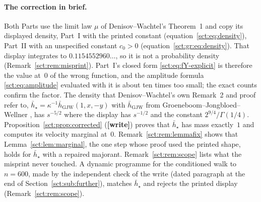\documentclass[11pt,letterpaper]{article}
\theoremstyle{definition}\newtheorem{remark}[theorem]{Remark}
\newcommand{\hstar}{\bar h_\star}\newcommand{\fstar}{f_\star}\newcommand{\Kstar}{K_\star}
\begin{document}
\paragraph{The correction in brief.} Both Parts use the limit law $\mu$ of Denisov--Wachtel's Theorem~1 \cite{dw} and copy its displayed density, Part~I with the printed constant (equation~\eqref{sct:eq:density}), Part~II with an unspecified constant $c_0>0$ (equation~\eqref{sct:gr:eq:density}). That display integrates to $0.1154552960\ldots$, so it is not a probability density (Remark~\ref{sct:rem:misprint}). Part~I's closed form \eqref{sct:eq:fY-explicit} is therefore the value at~$0$ of the wrong function, and the amplitude formula \eqref{sct:eq:amplitude} evaluated with it is about ten times too small; the exact counts confirm the factor. The density that Denisov--Wachtel's own Remark~2 and proof refer to, $\hstar=\kappa^{-1}\bar h_{\mathrm{GJW}}(1,x,-y)$ with $\bar h_{\mathrm{GJW}}$ from Groeneboom--Jongbloed--Wellner \cite[(2.24)]{gjw}, has $s^{-5/2}$ where the display has $s^{-1/2}$ and the constant $2^{9/4}/\Gamma(1/4)$. Proposition~\ref{sct:prop:corrected} (\textbf{[write]}) proves that $\hstar$ has mass exactly~$1$ and computes its velocity marginal at~$0$. Remark~\ref{sct:rem:lemmafix} shows that Lemma~\ref{sct:lem:marginal}, the one step whose proof used the printed shape, holds for $\hstar$ with a repaired majorant. Remark~\ref{sct:rem:scope} lists what the misprint never touched. A dynamic programme for the conditioned walk to $n=600$, made by the independent check of the write (dated paragraph at the end of Section~\ref{sct:sub:further}), matches $\hstar$ and rejects the printed display (Remark~\ref{sct:rem:scope}).
\end{document}
